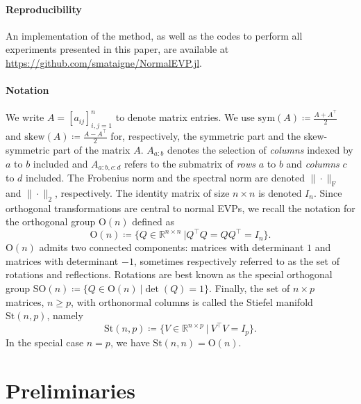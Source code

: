 \documentclass[10pt,twoside,dvipsnames]{siamart1116}
\numberwithin{algorithm}{section}
\numberwithin{equation}{section}
\begin{document}
\paragraph{Reproducibility} An implementation of the method, as well as the codes to perform all experiments presented in this paper, are available at \url{https://github.com/smataigne/NormalEVP.jl}.
\paragraph{Notation} We write $A=[a_{ij}]_{i,j=1}^n$ to denote matrix entries. We use $\mathrm{sym}(A)\coloneq\frac{A+A^\top }{2}$ and $\mathrm{skew}(A)\coloneq\frac{A-A^\top }{2}$ for, respectively, the symmetric part and the skew-symmetric part of the matrix $A$. $A_{a:b}$ denotes the selection of \emph{columns} indexed by $a$ to $b$ included and $A_{a:b,c:d}$ refers to the submatrix of \emph{rows} $a$ to $b$ and \emph{columns} $c$ to $d$ included. The Frobenius norm and the spectral norm are denoted $\|\cdot\|_\mathrm{F}$ and $\|\cdot\|_2$, respectively. The identity matrix of size $n\times n$ is denoted $I_n$. Since orthogonal transformations are central to normal EVPs, we recall the notation for the orthogonal group $\mathrm{O}(n)$ defined as 
\begin{equation}
	\nonumber
	\mathrm{O}(n) \coloneq\{Q\in\mathbb{R}^{n\times n}\ | Q^\top Q=QQ^\top =I_n\}.
\end{equation} 
$\mathrm{O}(n)$ admits two connected components: matrices with determinant $1$ and matrices with determinant $-1$, sometimes respectively referred to as the set of rotations and reflections. Rotations are best known as the special orthogonal group $\mathrm{SO}(n)\coloneq\{Q\in \mathrm{O}(n)\ | \det(Q)=1\}$. Finally, the set of $n\times p$ matrices, $n\geq p$, with orthonormal columns is called the Stiefel manifold $\mathrm{St}(n,p)$, namely
\begin{equation}
	\nonumber
	\mathrm{St}(n,p)\coloneq\{V\in\mathbb{R}^{n\times p}\ | \ V^\top V=I_p\}.
\end{equation}
In the special case $n=p$, we have $\mathrm{St}(n,n)= \mathrm{O}(n)$.

\section{Preliminaries}\label{sec:preliminaries}
\end{document}
